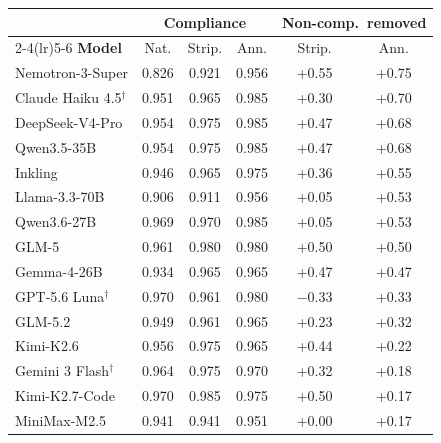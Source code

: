 \begin{table}[tbp]
\centering
\footnotesize
\setlength{\tabcolsep}{3pt}
\begin{tabular}{@{}l ccc cc@{}}
\toprule
 & \multicolumn{3}{c}{\textbf{Compliance}} & \multicolumn{2}{c}{\textbf{Non-comp.\ removed}} \\
\cmidrule(lr){2-4}\cmidrule(lr){5-6}
\textbf{Model} & Nat. & Strip. & Ann. & Strip. & Ann. \\
\midrule
Nemotron-3-Super & 0.826 & 0.921 & 0.956 & \cellcolor[HTML]{E9B885} +0.55 & \cellcolor[HTML]{E08F89} +0.75 \\
Claude Haiku 4.5$^{\dagger}$ & 0.951 & 0.965 & 0.985 & \cellcolor[HTML]{D7D387} +0.30 & \cellcolor[HTML]{E39988} +0.70 \\
DeepSeek-V4-Pro & 0.954 & 0.975 & 0.985 & \cellcolor[HTML]{EDC983} +0.47 & \cellcolor[HTML]{E39D88} +0.68 \\
Qwen3.5-35B & 0.954 & 0.975 & 0.985 & \cellcolor[HTML]{EDC983} +0.47 & \cellcolor[HTML]{E39D88} +0.68 \\
Inkling & 0.946 & 0.965 & 0.975 & \cellcolor[HTML]{E7D584} +0.36 & \cellcolor[HTML]{E9B885} +0.55 \\
Llama-3.3-70B & 0.906 & 0.911 & 0.956 & \cellcolor[HTML]{99CA93} +0.05 & \cellcolor[HTML]{EABC85} +0.53 \\
Qwen3.6-27B & 0.969 & 0.970 & 0.985 & \cellcolor[HTML]{99CA93} +0.05 & \cellcolor[HTML]{EABC85} +0.53 \\
GLM-5 & 0.961 & 0.980 & 0.980 & \cellcolor[HTML]{ECC284} +0.50 & \cellcolor[HTML]{ECC284} +0.50 \\
Gemma-4-26B & 0.934 & 0.965 & 0.965 & \cellcolor[HTML]{EDC783} +0.47 & \cellcolor[HTML]{EDC783} +0.47 \\
GPT-5.6 Luna$^{\dagger}$ & 0.970 & 0.961 & 0.980 & \cellcolor[HTML]{DFD485} $-$0.33 & \cellcolor[HTML]{E0D485} +0.33 \\
GLM-5.2 & 0.949 & 0.961 & 0.965 & \cellcolor[HTML]{C4D08B} +0.23 & \cellcolor[HTML]{DDD386} +0.32 \\
Kimi-K2.6 & 0.956 & 0.975 & 0.965 & \cellcolor[HTML]{EECD83} +0.44 & \cellcolor[HTML]{C3D08B} +0.22 \\
Gemini 3 Flash$^{\dagger}$ & 0.964 & 0.975 & 0.970 & \cellcolor[HTML]{DCD386} +0.32 & \cellcolor[HTML]{B9CE8D} +0.18 \\
Kimi-K2.7-Code & 0.970 & 0.985 & 0.975 & \cellcolor[HTML]{ECC284} +0.50 & \cellcolor[HTML]{B6CE8E} +0.17 \\
MiniMax-M2.5 & 0.941 & 0.941 & 0.951 & \cellcolor[HTML]{8CC896} +0.00 & \cellcolor[HTML]{B5CE8E} +0.17 \\

\end{tabular}
\end{table}
